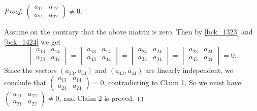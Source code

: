 \documentclass{amsart}
\numberwithin{equation}{section}
\theoremstyle{definition}
\renewcommand{\1}{\mathds{1}}
\renewcommand{\>}{\rightarrow}
\begin{document}
\begin{proof}
  $\begin{pmatrix}a_{11} & a_{12} \\ a_{21} & a_{22} \end{pmatrix} \neq 0$.

Assume on the contrary that the above matrix is zero. Then by \eqref{bck_1323} and \eqref{bck_1424} we get
$$ \begin{vmatrix} a_{13} & a_{14} \\ a_{33} & a_{34} \\ \end{vmatrix} = \begin{vmatrix} a_{13} & a_{14} \\ a_{43} & a_{44} \\ \end{vmatrix} = \begin{vmatrix} a_{23} & a_{24} \\ a_{33} & a_{34} \\ \end{vmatrix} = \begin{vmatrix} a_{23} & a_{24} \\ a_{43} & a_{44} \\ \end{vmatrix} =0.
$$
Since the vectors $(a_{33},a_{34})$ and $(a_{43},a_{44})$ are linearly independent, we conclude that $\begin{pmatrix}a_{13} & a_{14} \\ a_{23} & a_{24} \end{pmatrix} =0$, contradicting to Claim 1. So we must have  $\begin{pmatrix}a_{11} & a_{12} \\ a_{21} & a_{22} \end{pmatrix} \neq 0$, and Claim 2 is proved.


\end{proof}
\end{document}

